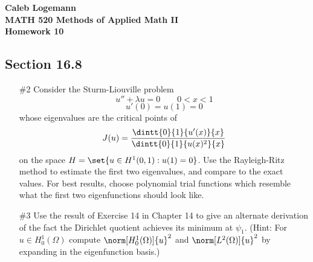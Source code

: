 \documentclass[11pt, oneside]{article}
\begin{document}
\noindent \textbf{\Large{Caleb Logemann \\
MATH 520 Methods of Applied Math II \\
Homework 10
}}

\subsection*{Section 16.8}
\begin{enumerate}
  \item[\#2]
    Consider the Sturm-Liouville problem
    \[
      u'' + \lambda u = 0 \qquad 0 < x < 1
    \]
    \[
      u'(0) = u(1) = 0
    \]
    whose eigenvalues are the critical points of
    \[
      J(u) = \frac{\dintt{0}{1}{u'(x)}{x}}{\dintt{0}{1}{u(x)^2}{x}}
    \]
    on the space $H = \set{u \in H^1(0, 1): u(1) = 0}$.
    Use the Rayleigh-Ritz method to estimate the first two eigenvalues, and
    compare to the exact values.
    For best results, choose polynomial trial functions which resemble what the
    first two eigenfunctions should look like.

  \pagebreak
  \item[\#3] %
    Use the result of Exercise 14 in Chapter 14 to give an alternate derivation
    of the fact the Dirichlet quotient achieves its minimum at $\psi_1$.
    (Hint: For $u \in H_0^1(\Omega)$ compute $\norm[H_0^1(\Omega)]{u}^2$ and
    $\norm[L^2(\Omega)]{u}^2$ by expanding in the eigenfunction basis.)


\end{enumerate}
\end{document}
